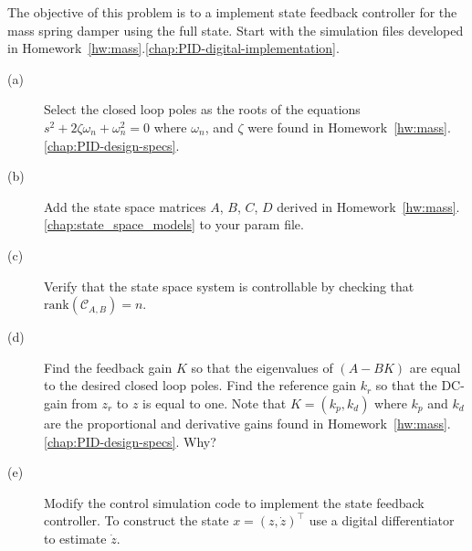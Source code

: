 
The objective of this problem is to a implement state feedback controller for the mass spring damper using the full state.
Start with the simulation files developed in Homework~\ref{hw:mass}.\ref{chap:PID-digital-implementation}.
\begin{description}
\item[(a)] Select the closed loop poles as the roots of the equations $s^2 + 2\zeta\omega_n + \omega_n^2 = 0$ where $\omega_n$, and $\zeta$ were found in Homework~\ref{hw:mass}.\ref{chap:PID-design-specs}.  
\item[(b)] Add the state space matrices $A$, $B$, $C$, $D$ derived in Homework~\ref{hw:mass}.\ref{chap:state_space_models} to your param file.
\item[(c)] Verify that the state space system is controllable by checking that $\text{rank}(\mathcal{C}_{A,B})=n$.
\item[(d)] Find the feedback gain $K$ so that the eigenvalues of $(A-BK)$ are equal to the desired closed loop poles.  Find the reference gain $k_r$ so that the DC-gain from $z_r$ to $z$ is equal to one.  Note that $K=(k_p, k_d)$ where $k_p$ and $k_d$ are the proportional and derivative gains found in Homework~\ref{hw:mass}.\ref{chap:PID-design-specs}.  Why?
\item[(e)] Modify the control simulation code to implement the state feedback controller.  To construct the state $x=(z, \dot{z})^{\top}$ use a digital differentiator to estimate $\dot{z}$.
\end{description}
